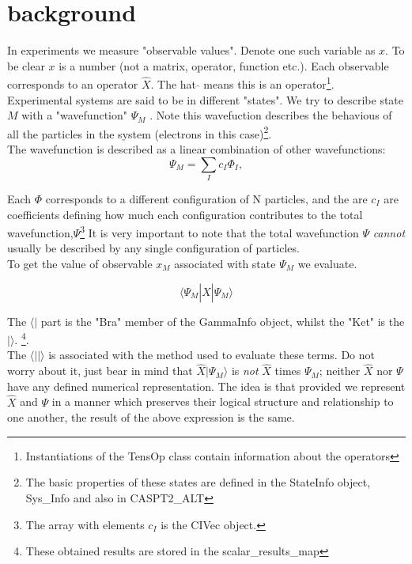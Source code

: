 \documentclass[12pt]{article}
\begin{document}
\section{background}

In experiments we measure "observable values". Denote one such variable as $x$.
To be clear $x$ is a number (not a matrix, operator, function  etc.). Each
observable corresponds to an operator $\hat{X}$. The hat $\hat{ }$ means this is
an operator\footnote{Instantiations of the TensOp class contain information
about the operators}.\\

Experimental systems are said to be in different "states". We try to describe
state $M$ with a "wavefunction" $\Psi_{M}$ . Note this wavefuction describes
the behavious of all the particles in the system (electrons in this case)\footnote{The
basic properties of these states are defined in the StateInfo object, Sys\_Info and also
in CASPT2\_ALT}. \\

The wavefunction is described as a linear combination of other wavefunctions:
\begin{equation}
\Psi_{M} = \sum_{I} c_{I}\Phi_{I},
\label {eqn:CI_wfn}
\end{equation}

Each $\Phi$ corresponds to a different configuration of N particles, and the
are $c_{I}$ are coefficients defining how much each configuration contributes to the  total
wavefunction,$\Psi$\footnote{The array with elements $c_{I}$ is the CIVec
object.} It is very important to note that the total wavefunction $\Psi$
\emph{cannot} usually be described by any single configuration of particles. \\ 

To get the value of observable $x_{M}$ associated with state $\Psi_{M}$ we evaluate.

\begin{equation}
\langle \Psi_{M} | \hat{X}| \Psi_{M} \rangle
\end{equation}

The $\langle |$ part is the "Bra" member of the GammaInfo object, whilst the "Ket" is the $| \rangle$.
\footnote{These obtained results are stored in the scalar\_results\_map}.\\

The $\langle | | \rangle$ is associated with the method used to evaluate these
terms.  Do not worry about it, just bear in mind that $\hat{X} |\Psi_{M}
\rangle$ is \emph{not} $\hat{X}$ times $\Psi_{M}$; neither $\hat{X}$ nor $\Psi$ have any
defined numerical representation. The idea is that provided we represent $\hat{X}$
and $\Psi$ in a manner which preserves their logical structure and relationship
to one another, the result of the above expression is the same. \\
 
\end{document}
